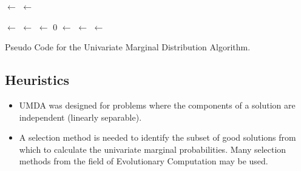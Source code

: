 \begin{algorithm}[htp]
	\SetLine  



  
	\KwIn{\NumBits, \PopulationSize, \SelectionSize}
	\KwOut{\Best}

	\Population $\leftarrow$ \InitializePopulation{\NumBits, \PopulationSize}\;
	\EvaluatePopulation{\Population}\;
	\Best $\leftarrow$ \GetBestSolution{\Population}\;
	
	\While{$\neg$\StopCondition{}} {
		\Selected $\leftarrow$ \SelectFitSolutions{\Population, \SelectionSize}\;
		\Vector $\leftarrow$ \CalculateFrequencyOfComponents{\Selected}\;
		\OffSpring $\leftarrow$ $0$\;
		 {
			\OffSpring $\leftarrow$ \ProbabilisticallyConstructSolution{\Vector}\;
		}
		\EvaluatePopulation{\OffSpring}\;
		\Best $\leftarrow$ \GetBestSolution{\OffSpring}\;
		\Population $\leftarrow$ \OffSpring\;
	}
	\Return{\Best}\;
	
	\caption{Pseudo Code for the Univariate Marginal Distribution Algorithm.}
	\label{alg:umda}
\end{algorithm}

\subsection{Heuristics}
\begin{itemize}
	\item UMDA was designed for problems where the components of a solution are independent (linearly separable).
	\item A selection method is needed to identify the subset of good solutions from which to calculate the univariate marginal probabilities. Many selection methods from the field of Evolutionary Computation may be used.
\end{itemize}

